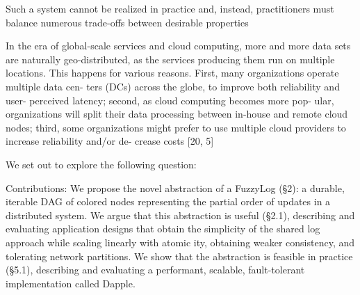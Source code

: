 Such a system cannot be realized in practice and, instead, practitioners must balance numerous trade-offs between desirable properties

In the era of global-scale services and cloud computing,
more and more data sets are naturally geo-distributed,
as the services producing them run on multiple locations.
This happens for various reasons.
First, many organizations operate multiple data cen-
ters (DCs) across the globe, to improve both reliability and user-
perceived latency; second, as cloud computing becomes more pop-
ular, organizations will split their data processing between in-house
and  remote  cloud  nodes;  third,  some  organizations  might  prefer
to  use  multiple  cloud  providers  to  increase  reliability  and/or  de-
crease  costs  [20,  5]

%
We set out to explore the following question:


Contributions: We propose the novel abstraction of a FuzzyLog (§2): a durable, iterable DAG of colored nodes representing the partial order of updates in a distributed system. We argue that this abstraction is useful (§2.1), describing and evaluating application designs that obtain the simplicity of the shared log approach while scaling linearly with atomic­ ity, obtaining weaker consistency, and tolerating network partitions. We show that the abstraction is feasible in practice (§5.1), describing and evaluating a performant, scalable, fault-tolerant implementation called Dapple.



